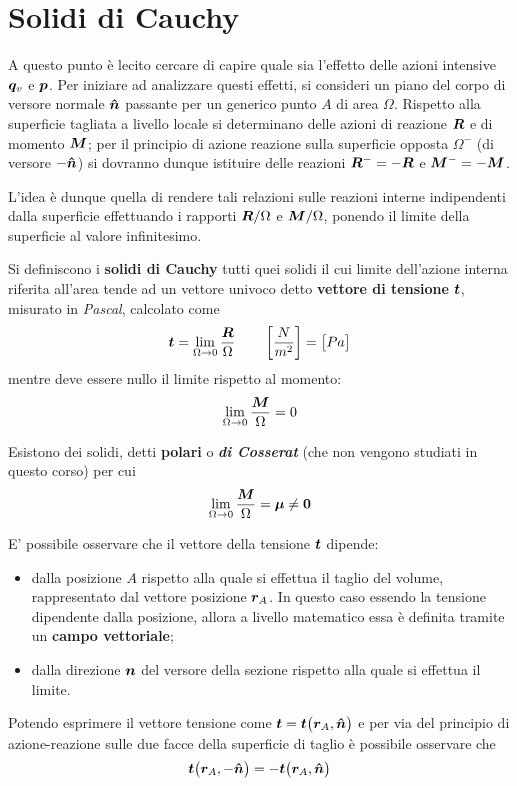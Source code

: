 \section{Solidi di Cauchy}
	A questo punto è lecito cercare di capire quale sia l'effetto delle azioni intensive $\boldsymbol{q}_v$ e $\boldsymbol{p}$. 
	Per iniziare ad analizzare questi effetti, si consideri un piano del corpo di versore normale $\boldsymbol{\hat{n}}$ passante per un generico punto $A$ di area $ \Omega$. Rispetto alla superficie tagliata a livello locale si determinano delle azioni di reazione $ \boldsymbol{R}$ e di momento $ \boldsymbol{M}$; per il principio di azione reazione sulla superficie opposta $ \Omega^-$ (di versore $-\boldsymbol{\hat{n}}$) si dovranno dunque istituire delle reazioni $ \boldsymbol{R}^- = -  \boldsymbol{R}$ e $ \boldsymbol{M}^- = -  \boldsymbol{M}$.
	
	L'idea è dunque quella di rendere tali relazioni sulle reazioni interne indipendenti dalla superficie effettuando i rapporti $ \boldsymbol{R} /  \Omega$ e $ \boldsymbol{M} /  \Omega$, ponendo il limite della superficie al valore infinitesimo.
	
	\begin{concetto}
		Si definiscono i \textbf{solidi di Cauchy} tutti quei solidi il cui limite dell'azione interna riferita all'area tende ad un vettore univoco detto \textbf{vettore di tensione} $\boldsymbol{t}$, misurato in \textit{Pascal}, calcolato come
		\begin{equation}
			\boldsymbol{t} = \lim_{\Omega \rightarrow 0}  \frac {\boldsymbol{R}}\Omega \qquad \left[\frac N {m^2}\right] = \big[Pa\big]
		\end{equation}
		mentre deve essere nullo il limite rispetto al momento:
		\[ \lim_{\Omega \rightarrow 0}  \frac {\boldsymbol{M}}\Omega = 0  \]
	\end{concetto}
	\begin{nota}
		Esistono dei solidi, detti \textbf{polari} o \textbf{\textit{di Cosserat}} (che non vengono studiati in questo corso) per cui
		\[ \lim_{\Omega \rightarrow 0}  \frac {\boldsymbol{M}}\Omega = \boldsymbol{\mu} \neq \boldsymbol{0}  \]
	\end{nota}
	E' possibile osservare che il vettore della tensione $\boldsymbol{t}$ dipende:
	\begin{itemize}
		\item dalla posizione $A$ rispetto alla quale si effettua il taglio del volume, rappresentato dal vettore posizione $\boldsymbol{r}_A$. In questo caso essendo la tensione dipendente dalla posizione, allora a livello matematico essa è definita tramite un \textbf{campo vettoriale};
		\item dalla direzione $\boldsymbol{n}$ del versore della sezione rispetto alla quale si effettua il limite.
	\end{itemize}
	Potendo esprimere il vettore tensione come $\boldsymbol{t} = \boldsymbol{t}\big(\boldsymbol{r}_A,\boldsymbol{\hat{n}}\big)$ e per via del principio di azione-reazione sulle due facce della superficie di taglio è possibile osservare che
	\[ \boldsymbol{t}\big(\boldsymbol{r}_A,-\boldsymbol{\hat{n}}\big) = - \boldsymbol{t} \big(\boldsymbol{r}_A,\boldsymbol{\hat{n}}\big) \]
	
